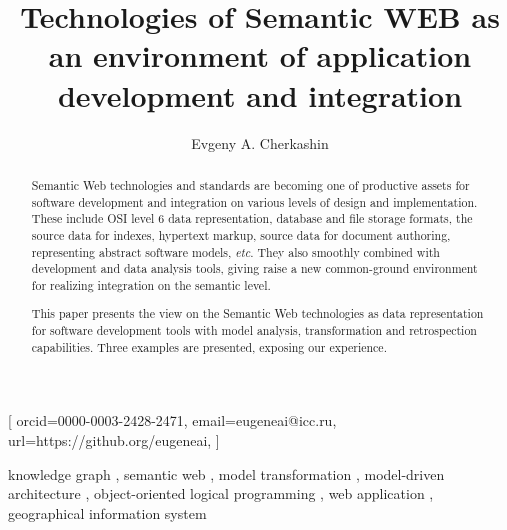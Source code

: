 \documentclass[
]{ceurart}
\begin{document}


\title{Technologies of Semantic WEB as an environment of application development and integration}
\author[1,2]{Evgeny A. Cherkashin}[%
orcid=0000-0003-2428-2471,
email=eugeneai@icc.ru,
url=https://github.org/eugeneai,
]
\address[1]{Matrosov Institute for System Dynamics and Control Theory of Siberian Branch of Russian Academy of Sciences, 134 Lermontov St, Irkutsk, 664033, Russian Federation}

\address[2]{Institute for Mathematics and Information Technologies, Irkutsk State University, 20~Gagarina Bulv, Irkutsk, 664003, Russian Federation}

\begin{abstract}
  Semantic Web technologies and standards are becoming one of productive assets for software development and integration on various levels of design and implementation.  These include OSI level 6 data representation, database and file storage formats, the source data for indexes, hypertext markup, source data for document authoring, representing abstract software models, \emph{etc}.  They also smoothly combined with development and data analysis tools, giving raise a new common-ground environment for realizing integration on the semantic level.

  This paper presents the view on the Semantic Web technologies as data representation for software development tools with model analysis, transformation and retrospection capabilities.  Three examples are presented, exposing our experience.
\end{abstract}

\begin{keywords}
  knowledge graph \sep
  semantic web \sep
  model transformation \sep
  model-driven architecture \sep
  object-oriented logical programming \sep
  web application \sep
  geographical information system
\end{keywords}
\end{document}
